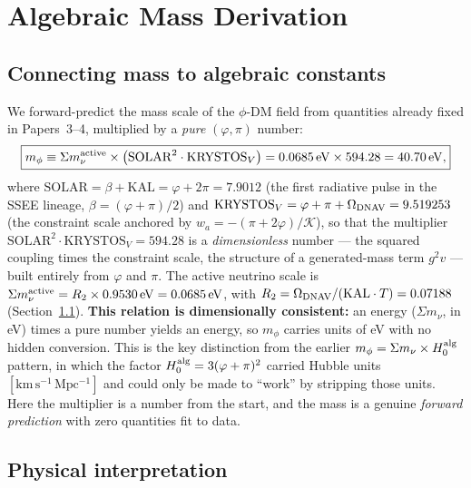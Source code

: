 \documentclass[12pt,a4paper]{article}
\newcommand{\mphi}{m_\phi}
\newcommand{\mnu}{\Sigma m_\nu}
\newcommand{\Halg}{H_0^{\rm alg}}
\newcommand{\KAL}{\mathrm{KAL}}
\begin{document}
\section{Algebraic Mass Derivation}
\label{sec:mass}

\subsection{Connecting mass to algebraic constants}
\label{subsec:mass_derivation}

We forward-predict the mass scale of the $\phi$-DM field from quantities already
fixed in Papers~3--4, multiplied by a \emph{pure} $(\varphi,\pi)$ number:
\begin{equation}
  \boxed{\mphi \equiv \mnu^{\rm active} \times
    \bigl(\mathrm{SOLAR}^2\cdot\mathrm{KRYSTOS}_V\bigr)
    = 0.0685\,\mathrm{eV} \times 594.28 = 40.70\,\mathrm{eV},}
  \label{eq:mass_algebraic}
\end{equation}
where $\mathrm{SOLAR}=\beta+\KAL=\varphi+2\pi=7.9012$ (the first radiative pulse in
the SSEE lineage, $\beta=(\varphi+\pi)/2$) and
$\mathrm{KRYSTOS}_V=\varphi+\pi+\Omega_{\rm DNAV}=9.519253$ (the constraint scale anchored by
$w_a=-(\pi+2\varphi)/\mathcal{K}$), so that the multiplier
$\mathrm{SOLAR}^2\cdot\mathrm{KRYSTOS}_V = 594.28$ is a \emph{dimensionless}
number --- the squared coupling times the constraint scale, the structure of a
generated-mass term $g^2 v$ --- built entirely from $\varphi$
and $\pi$. The active neutrino scale is
$\mnu^{\rm active}=R_2\times0.9530\,\mathrm{eV}=0.0685\,\mathrm{eV}$, with
$R_2=\Omega_{\rm DNAV}/(\KAL\cdot T)=0.07188$
(Section~\ref{subsec:mass_derivation}). \textbf{This relation is dimensionally
consistent:} an energy ($\mnu$, in eV) times a pure number yields an energy, so
$\mphi$ carries units of eV with no hidden conversion. This is the key
distinction from the earlier $\mphi=\mnu\times\Halg$ pattern, in which the factor
$\Halg=3(\varphi+\pi)^2$ carried Hubble units $[\mathrm{km\,s^{-1}\,Mpc^{-1}}]$
and could only be made to ``work'' by stripping those units. Here the multiplier
is a number from the start, and the mass is a genuine \emph{forward prediction}
with zero quantities fit to data.

\subsection{Physical interpretation}
\label{subsec:mass_interpretation}
\end{document}
